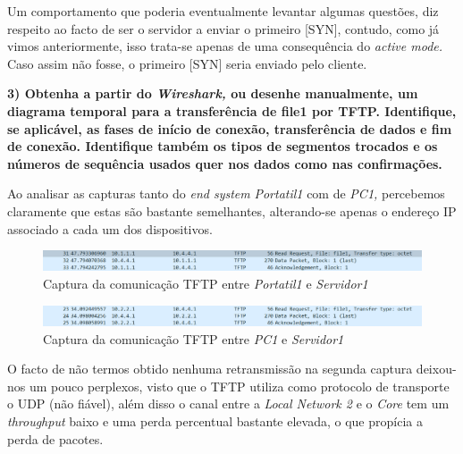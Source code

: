         Um comportamento que poderia eventualmente levantar algumas questões, diz respeito ao facto de ser o servidor a enviar o primeiro [SYN], contudo, como já vimos anteriormente, isso trata-se apenas de uma consequência do \textit{active mode.} Caso assim não fosse, o primeiro [SYN] seria enviado pelo cliente.  

        \textbf{3) Obtenha a partir do \textit{Wireshark,} ou desenhe manualmente, um diagrama temporal para a transferência de file1 por TFTP. Identifique, se aplicável, as fases de início de conexão, transferência de dados e fim de conexão. Identifique também os tipos de segmentos trocados e os números de sequência usados quer nos dados como nas confirmações.}

        Ao analisar as capturas tanto do \textit{end system} \textit{Portatil1} com  de \textit{PC1,} percebemos claramente que estas são bastante semelhantes, alterando-se apenas o endereço IP associado a cada um dos dispositivos.

        \begin{figure}[hb!]
            \centering
            \includegraphics[width=\textwidth]{Imagens/7.png}
            \caption{Captura da comunicação TFTP entre \textit{Portatil1} e \textit{Servidor1}}
            \vspace{-10pt}
        \end{figure}

        \begin{figure}[hb!]
            \centering
            \includegraphics[width=\textwidth]{Imagens/8.png}
            \caption{Captura da comunicação TFTP entre \textit{PC1} e \textit{Servidor1}}
            \vspace{-10pt}
        \end{figure}

        O facto de não termos obtido nenhuma retransmissão na segunda captura deixou-nos um pouco perplexos, visto que o TFTP utiliza como protocolo de transporte o UDP (não fiável), além disso o canal entre a \textit{Local Network 2} e o \textit{Core} tem um \textit{throughput} baixo e uma perda percentual bastante elevada, o que propícia a perda de pacotes.

